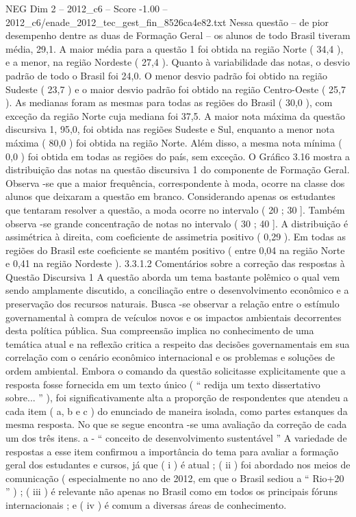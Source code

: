 \begin{textsample}{NEG Dim 2 – 2012\_c6 – Score -1.00 – 2012\_c6/enade\_2012\_tec\_gest\_fin\_8526ca4e82.txt}
Nessa questão – de pior desempenho dentre as duas de Formação Geral – os alunos de todo Brasil tiveram média, 29,1.
A maior média para a questão 1 foi obtida na região Norte ( 34,4 ), e a menor, na região Nordeste ( 27,4 ).
Quanto à variabilidade das notas, o desvio padrão de todo o Brasil foi 24,0.
O menor desvio padrão foi obtido na região Sudeste ( 23,7 ) e o maior desvio padrão foi obtido na região Centro-Oeste ( 25,7 ).
As medianas foram as mesmas para todas as regiões do Brasil ( 30,0 ), com exceção da região Norte cuja mediana foi 37,5.
A maior nota máxima da questão discursiva 1, 95,0, foi obtida nas regiões Sudeste e Sul, enquanto a menor nota máxima ( 80,0 ) foi obtida na região Norte.
Além disso, a mesma nota mínima ( 0,0 ) foi obtida em todas as regiões do país, sem exceção.
O Gráfico 3.16 mostra a distribuição das notas na questão discursiva 1 do componente de Formação Geral.
Observa -se que a maior frequência, correspondente à moda, ocorre na classe dos alunos que deixaram a questão em branco.
Considerando apenas os estudantes que tentaram resolver a questão, a moda ocorre no intervalo ( 20 ; 30 ].
Também observa -se grande concentração de notas no intervalo ( 30 ; 40 ].
A distribuição é assimétrica à direita, com coeficiente de assimetria positivo ( 0,29 ).
Em todas as regiões do Brasil este coeficiente se mantém positivo ( entre 0,04 na região Norte e 0,41 na região Nordeste ). 3.3.1.2 Comentários sobre a correção das respostas à Questão Discursiva 1 A questão aborda um tema bastante polêmico o qual vem sendo amplamente discutido, a conciliação entre o desenvolvimento econômico e a preservação dos recursos naturais.
Busca -se observar a relação entre o estímulo governamental à compra de veículos novos e os impactos ambientais decorrentes desta política pública.
Sua compreensão implica no conhecimento de uma temática atual e na reflexão critica a respeito das decisões governamentais em sua correlação com o cenário econômico internacional e os problemas e soluções de ordem ambiental.
Embora o comando da questão solicitasse explicitamente que a resposta fosse fornecida em um texto único ( “ redija um texto dissertativo sobre... ” ), foi significativamente alta a proporção de respondentes que atendeu a cada item ( a, b e c ) do enunciado de maneira isolada, como partes estanques da mesma resposta.
No que se segue encontra -se uma avaliação da correção de cada um dos três itens. a - “ conceito de desenvolvimento sustentável ” A variedade de respostas a esse item confirmou a importância do tema para avaliar a formação geral dos estudantes e cursos, já que ( i ) é atual ; ( ii ) foi abordado nos meios de comunicação ( especialmente no ano de 2012, em que o Brasil sediou a “ Rio+20 ” ) ; ( iii ) é relevante não apenas no Brasil como em todos os principais fóruns internacionais ; e ( iv ) é comum a diversas áreas de conhecimento.

\end{textsample}
